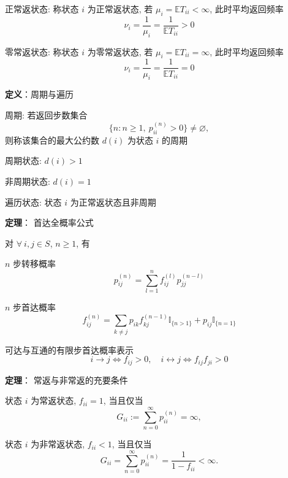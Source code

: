 \documentclass[openany]{ctexbook}
\theoremstyle{kaiti}
\theoremstyle{normal}
\begin{document}
正常返状态: 称状态 $i$ 为正常返状态, 若 $\mu_i=\mathbb{E}T_{ii}<\infty$, 此时平均返回频率
\begin{equation}
  \nu_i=\frac{1}{\mu_i}=\frac{1}{\mathbb{E}T_{ii}}>0
\end{equation}

零常返状态: 称状态 $i$ 为零常返状态, 若 $\mu_i=\mathbb{E}T_{ii}=\infty$, 此时平均返回频率
\begin{equation}
  \nu_i=\frac{1}{\mu_i}=\frac{1}{\mathbb{E}T_{ii}}=0
\end{equation}

\textbf{定义}：周期与遍历

周期: 若返回步数集合 
\begin{equation}
  \Big\{n:n\geqslant1,~p_{ii}^{(n)}>0\Big\}\neq\varnothing,
\end{equation} 
则称该集合的最大公约数 $d(i)$ 为状态 $i$ 的周期

周期状态: $d(i)>1$

非周期状态: $d(i)=1$

遍历状态: 状态 $i$ 为正常返状态且非周期

\textbf{定理}： 首达全概率公式

对 $\forall~i,j\in S$, $n\geqslant1$, 有

$n$ 步转移概率
\begin{equation}
  p_{ij}^{(n)}=\sum_{l=1}^n f_{ij}^{(l)}p_{jj}^{(n-l)}
\end{equation}

$n$ 步首达概率
\begin{equation}
  f_{ij}^{(n)}=\sum_{k\neq j}p_{ik}f_{kj}^{(n-1)}\mathbb{I}_{\{n>1\}}+p_{ij}\mathbb{I}_{\{n=1\}}
\end{equation}

可达与互通的有限步首达概率表示
\begin{equation}
  i\to j\Leftrightarrow f_{ij}>0,\quad i\leftrightarrow j\Leftrightarrow f_{ij}f_{ji}>0
\end{equation}

\textbf{定理}： 常返与非常返的充要条件

状态 $i$ 为常返状态, $f_{ii}=1$, 当且仅当
\begin{equation}
  G_{ii}:=\sum_{n=0}^\infty p_{ii}^{(n)}=\infty,
\end{equation}

状态 $i$ 为非常返状态, $f_{ii}<1$, 当且仅当
\begin{equation}
  G_{ii}=\sum_{n=0}^\infty p_{ii}^{(n)}=\frac{1}{1-f_{ii}}<\infty.
\end{equation}
\end{document}
